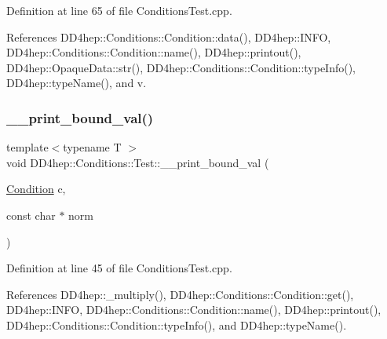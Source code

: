 Definition at line 65 of file Conditions\+Test.\+cpp.



References D\+D4hep\+::\+Conditions\+::\+Condition\+::data(), D\+D4hep\+::\+I\+N\+FO, D\+D4hep\+::\+Conditions\+::\+Condition\+::name(), D\+D4hep\+::printout(), D\+D4hep\+::\+Opaque\+Data\+::str(), D\+D4hep\+::\+Conditions\+::\+Condition\+::type\+Info(), D\+D4hep\+::type\+Name(), and v.

\hypertarget{namespace_d_d4hep_1_1_conditions_1_1_test_ab03a688e791c0dd4e363d9a61beb6d65}{}\label{namespace_d_d4hep_1_1_conditions_1_1_test_ab03a688e791c0dd4e363d9a61beb6d65} 
\subsubsection{\texorpdfstring{\+\_\+\+\_\+print\+\_\+bound\+\_\+val()}{\_\_print\_bound\_val()}}
{\footnotesize\ttfamily template$<$typename T $>$ \\
void D\+D4hep\+::\+Conditions\+::\+Test\+::\+\_\+\+\_\+print\+\_\+bound\+\_\+val (\begin{DoxyParamCaption}\item[{\hyperlink{class_d_d4hep_1_1_conditions_1_1_condition}{Condition}}]{c,  }\item[{const char $\ast$}]{norm }\end{DoxyParamCaption})}



Definition at line 45 of file Conditions\+Test.\+cpp.



References D\+D4hep\+::\+\_\+multiply(), D\+D4hep\+::\+Conditions\+::\+Condition\+::get(), D\+D4hep\+::\+I\+N\+FO, D\+D4hep\+::\+Conditions\+::\+Condition\+::name(), D\+D4hep\+::printout(), D\+D4hep\+::\+Conditions\+::\+Condition\+::type\+Info(), and D\+D4hep\+::type\+Name().

\hypertarget{namespace_d_d4hep_1_1_conditions_1_1_test_a972a45916702fce81a9f0bc73d0e4bf0}{}\label{namespace_d_d4hep_1_1_conditions_1_1_test_a972a45916702fce81a9f0bc73d0e4bf0} 
